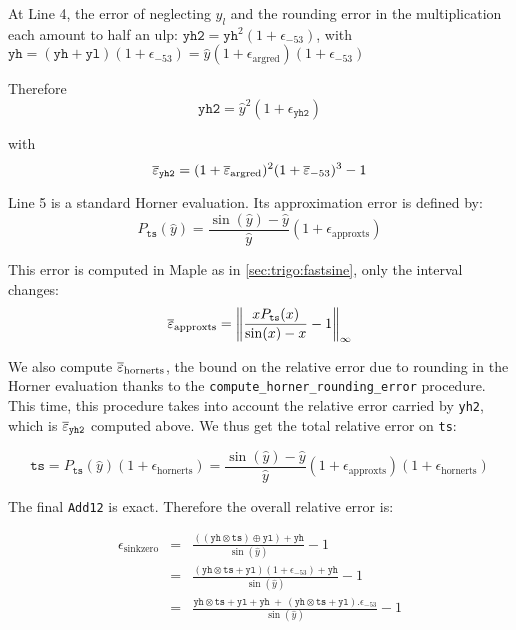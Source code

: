 At Line 4, the error of neglecting $y_l$ and the rounding error in the
multiplication each amount to half an ulp:
  $\mathtt{yh2}=\mathtt{yh}^2(1+\epsilon_{-53})$,
 with $\mathtt{yh} = (\mathtt{yh}+\mathtt{yl})(1+\epsilon_{-53}) = \hat{y}(1+\epsilon_{\mathrm{argred}})(1+\epsilon_{-53})$

Therefore
\begin{equation}
  \mathtt{yh2}=\hat{y}^2(1+\epsilon_{\mathtt{yh2}})
\end{equation}

with
\begin{equation}
  {\overline{\varepsilon}}_{\mathtt{yh2}} = (1+{\overline{\varepsilon}}_{\mathrm{argred}})^2(1+{\overline{\varepsilon}}_{-53})^3 - 1
\end{equation}

Line 5 is a standard Horner evaluation. Its approximation error is defined by:
$$
P_{\mathtt{ts}}(\hat{y}) = \frac{\sin(\hat{y})-\hat{y}}{\hat{y}}(1+\epsilon_{\mathrm{approxts}})
$$

This error is computed in Maple as in \ref{sec:trigo:fastsine}, only the interval changes:
$${\overline{\varepsilon}}_{\mathrm{approxts}} = \left\Vert \frac{xP_{\mathtt{ts}}(x)}{\sin(x)-x} -1 \right\Vert_{\infty}$$

We also compute ${\overline{\varepsilon}}_{\mathrm{hornerts}}$, the bound on the relative error due
to rounding in the Horner evaluation thanks to the
\texttt{compute\_horner\_rounding\_error} procedure. This time, this procedure
takes into account the relative error carried by \texttt{yh2}, which is
${\overline{\varepsilon}}_{\mathtt{yh2}}$ computed above.
We thus get the total relative error on \texttt{ts}:

\begin{equation}
  \mathtt{ts} = P_{\mathtt{ts}}(\hat{y})(1+\epsilon_{\mathrm{hornerts}}) = \frac{\sin(\hat{y})-\hat{y}}{\hat{y}}(1+\epsilon_{\mathrm{approxts}})(1+\epsilon_{\mathrm{hornerts}})
  \label{eq:sink0ts}
\end{equation}

The final \texttt{Add12} is exact. Therefore the overall relative error is:

\begin{eqnarray*}
  \epsilon_{\mathrm{sinkzero}}
  &=& \frac{((\mathtt{yh}\otimes \mathtt{ts}) \oplus \mathtt{yl}) + \mathtt{yh}}{\sin(\hat{y})} -1 \\
  &=& \frac{(\mathtt{yh}\otimes\mathtt{ts} + \mathtt{yl})(1+\epsilon_{-53}) + \mathtt{yh}}{\sin(\hat{y})} -1\\
  &=& \frac{\mathtt{yh}\otimes\mathtt{ts} + \mathtt{yl} + \mathtt{yh}    \ +\  (\mathtt{yh}\otimes\mathtt{ts} + \mathtt{yl}).\epsilon_{-53}}{\sin(\hat{y})} -1\\
\end{eqnarray*}

